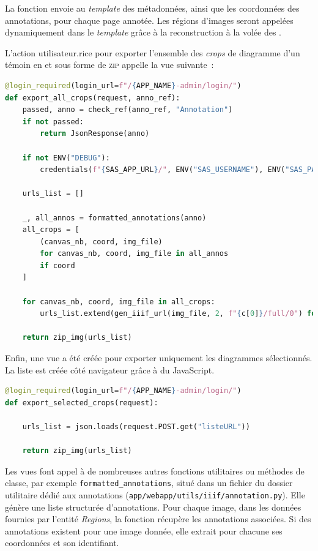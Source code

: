 La fonction envoie au \textit{template} des métadonnées, ainsi que les coordonnées des annotations, pour chaque page annotée. Les régions d'images seront appelées dynamiquement dans le \textit{template} grâce à la reconstruction à la volée des \URLs \iiif. 

L'action utilisateur.rice pour exporter l'ensemble des \textit{crops} de diagramme d'un témoin en \jpeg et sous forme de \textsc{zip} appelle la vue suivante~: 

\begin{lstlisting}[language=python, frame=single, breaklines=true, caption={Vue pour l'export de l'ensemble des diagrammes du témoin affiché.}]
@login_required(login_url=f"/{APP_NAME}-admin/login/")
def export_all_crops(request, anno_ref):
    passed, anno = check_ref(anno_ref, "Annotation")
    if not passed:
        return JsonResponse(anno)

    if not ENV("DEBUG"):
        credentials(f"{SAS_APP_URL}/", ENV("SAS_USERNAME"), ENV("SAS_PASSWORD"))

    urls_list = []

    _, all_annos = formatted_annotations(anno)
    all_crops = [
        (canvas_nb, coord, img_file)
        for canvas_nb, coord, img_file in all_annos
        if coord
    ]

    for canvas_nb, coord, img_file in all_crops:
        urls_list.extend(gen_iiif_url(img_file, 2, f"{c[0]}/full/0") for c in coord)

    return zip_img(urls_list)
\end{lstlisting}

Enfin, une vue a été créée pour exporter uniquement les diagrammes sélectionnés. La liste est créée côté navigateur grâce à du JavaScript.  

\begin{lstlisting}[language=python, frame=single, breaklines=true, caption={Vue pour l'export d'une liste de diagrammes.}]
@login_required(login_url=f"/{APP_NAME}-admin/login/")
def export_selected_crops(request):

    urls_list = json.loads(request.POST.get("listeURL"))

    return zip_img(urls_list)
\end{lstlisting}

Les vues font appel à de nombreuses autres fonctions utilitaires ou méthodes de classe, par exemple \texttt{formatted\_annotations}, situé dans un fichier du dossier utilitaire dédié aux annotations \iiif (\texttt{app/webapp/utils/iiif/annotation.py}). Elle génère une liste structurée d'annotations. Pour chaque image, dans les données fournies par l'entité \textit{Regions}, la fonction récupère les annotations associées. Si des annotations existent pour une image donnée, elle extrait pour chacune ses coordonnées et son identifiant. 

